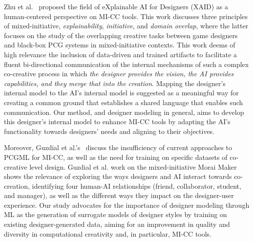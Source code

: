 Zhu et al.~ proposed the field of eXplainable AI for Designers (XAID) as a human-centered perspective on MI-CC tools. This work discusses three principles of mixed-initiative, \emph{explainability}, \emph{initiative}, and \emph{domain overlap}, where the latter focuses on the study of the overlapping creative tasks between game designers and black-box PCG systems in mixed-initiative contexts. This work deems of high relevance the inclusion of data-driven and trained artifacts to facilitate a fluent bi-directional communication of the internal mechanisms of such a complex co-creative process in which \textit{the designer provides the vision, the AI provides capabilities, and they merge that into the creation}. Mapping the designer's internal model to the AI's internal model is suggested as a meaningful way for creating a common ground that establishes a shared language that enables such communication. Our method, and designer modeling in general, aims to develop this designer's internal model to enhance MI-CC tools by adapting the AI's functionality towards designers' needs and aligning to their objectives.






Moreover, Guzdial et al.'s~ discuss the insufficiency of current approaches to PCGML for MI-CC, as well as the need for training on specific datasets of co-creative level design. Guzdial et al. work on the mixed-initiative Morai Maker~ shows the relevance of exploring the ways designers and AI interact towards co-creation, identifying four human-AI relationships (friend, collaborator, student, and manager), as well as the different ways they impact on the designer-user experience. Our study advocates for the importance of designer modeling through ML as the generation of surrogate models of designer styles by training on existing designer-generated data, aiming for an improvement in quality and diversity in computational creativity and, in particular, MI-CC tools. 

